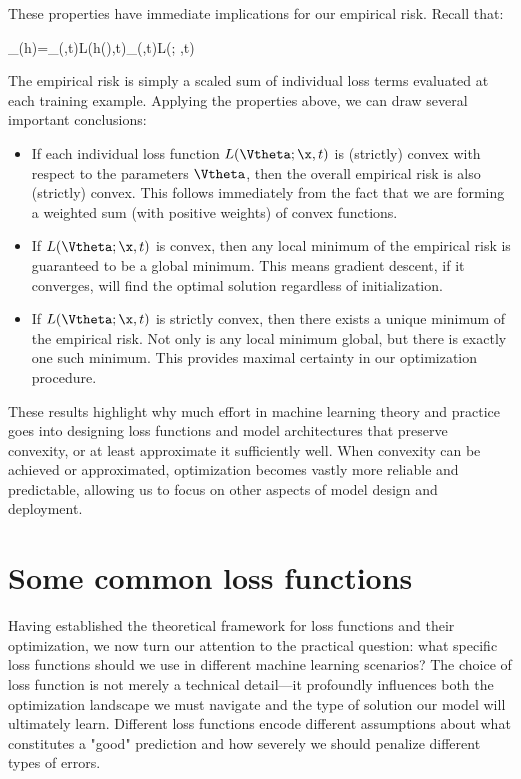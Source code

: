 These properties have immediate implications for our empirical risk. Recall that:
\begin{myequation}
	_{}(h)=\sum_{(\x,t)\in{}}L(h(\x),t)\propto\sum_{(\x,t)\in{}}L(\Vtheta; \x,t)
\end{myequation}

The empirical risk is simply a scaled sum of individual loss terms evaluated at each training example. Applying the properties above, we can draw several important conclusions:
\begin{itemize}
\item If each individual loss function $L(\Vtheta; \x,t)$ is (strictly) convex with respect to the parameters $\Vtheta$, then the overall empirical risk is also (strictly) convex. This follows immediately from the fact that we are forming a weighted sum (with positive weights) of convex functions.

\item If $L(\Vtheta; \x,t)$ is convex, then any local minimum of the empirical risk is guaranteed to be a global minimum. This means gradient descent, if it converges, will find the optimal solution regardless of initialization.

\item If $L(\Vtheta; \x,t)$ is strictly convex, then there exists a unique minimum of the empirical risk. Not only is any local minimum global, but there is exactly one such minimum. This provides maximal certainty in our optimization procedure.
\end{itemize}

These results highlight why much effort in machine learning theory and practice goes into designing loss functions and model architectures that preserve convexity, or at least approximate it sufficiently well. When convexity can be achieved or approximated, optimization becomes vastly more reliable and predictable, allowing us to focus on other aspects of model design and deployment.



\section*{Some common loss functions}

Having established the theoretical framework for loss functions and their optimization, we now turn our attention to the practical question: what specific loss functions should we use in different machine learning scenarios? The choice of loss function is not merely a technical detail—it profoundly influences both the optimization landscape we must navigate and the type of solution our model will ultimately learn. Different loss functions encode different assumptions about what constitutes a "good" prediction and how severely we should penalize different types of errors.

